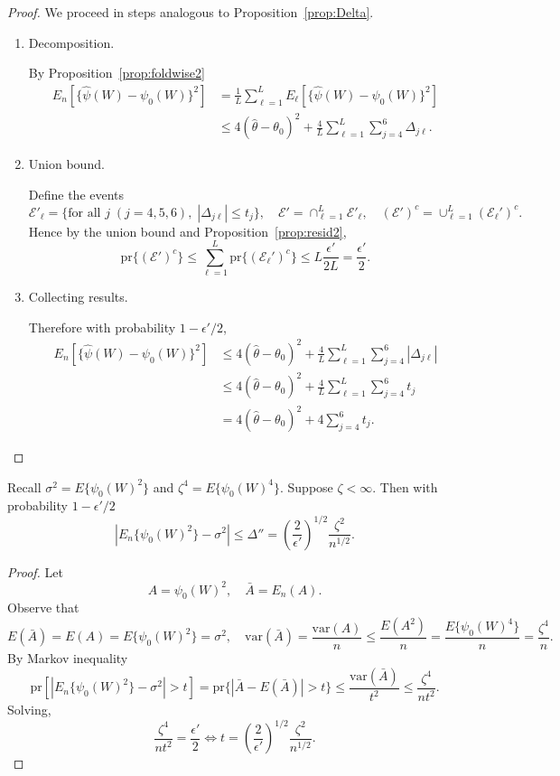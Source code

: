 \begin{proof}
We proceed in steps analogous to Proposition~\ref{prop:Delta}.
\begin{enumerate}
    \item Decomposition.
    
    By Proposition~\ref{prop:foldwise2}
    \begin{align*}
    E_n[\{\hat{\psi}(W)-\psi_0(W)\}^2]
    &=\frac{1}{L} \sum_{\ell=1}^L E_{\ell}[\{\hat{\psi}(W)-\psi_0(W)\}^2] \\
    &\leq 4(\hat{\theta}-\theta_0)^2+\frac{4}{L} \sum_{\ell=1}^L \sum_{j=4}^6 \Delta_{j\ell}.
\end{align*} 

    \item Union bound.
    
    Define the events
$$
\mathcal{E}'_{\ell}=\{\text{for all } j \; (j=4,5,6),\; |\Delta_{j\ell}|\leq t_j\},\quad \mathcal{E}'=\cap_{\ell=1}^L \mathcal{E}'_{\ell},\quad (\mathcal{E}')^c=\cup_{\ell=1}^L (\mathcal{E}_{\ell}')^c.
$$
Hence by the union bound and Proposition~\ref{prop:resid2},
$$
\text{pr}\{(\mathcal{E}')^c\}\leq \sum_{\ell=1}^L \text{pr}\{(\mathcal{E}_{\ell}')^c\} \leq L\frac{\epsilon'}{2L}=\frac{\epsilon'}{2}.
$$
    \item Collecting results.

    Therefore with probability $1-\epsilon'/2$,
\begin{align*}
 E_n[\{\hat{\psi}(W)-\psi_0(W)\}^2]&\leq 4(\hat{\theta}-\theta_0)^2+\frac{4}{L} \sum_{\ell=1}^L \sum_{j=4}^6 |\Delta_{j\ell}| \\
 &\leq 4(\hat{\theta}-\theta_0)^2+\frac{4}{L} \sum_{\ell=1}^L \sum_{j=4}^6 t_j \\
 &=4(\hat{\theta}-\theta_0)^2+4 \sum_{j=4}^6 t_j.
\end{align*}
\end{enumerate}
\end{proof}


\begin{proposition}\label{prop:other_half}
Recall $\sigma^2=E\{\psi_0(W)^2\}$ and $\zeta^4=E\{\psi_0(W)^4\}$. Suppose $\zeta<\infty$. Then with probability $1-\epsilon'/2$
$$
|E_n\{\psi_0(W)^2\}-\sigma^2|\leq \Delta''=\left(\frac{2}{\epsilon'}\right)^{1/2}\frac{\zeta^2}{n^{1/2}}.
$$
\end{proposition}

\begin{proof}
Let
$$
A=\psi_0(W)^2,\quad \bar{A}=E_n(A).
$$
Observe that
$$
E(\bar{A})=E(A)=E\{\psi_0(W)^2\}=\sigma^2,\quad 
\text{var}(\bar{A})=\frac{\text{var}(A)}{n}
\leq \frac{E(A^2)}{n}
=\frac{E\{\psi_0(W)^4\}}{n}=\frac{\zeta^4}{n}.
$$
By Markov inequality
$$
\text{pr}[|E_n\{\psi_0(W)^2\}-\sigma^2|>t]=\text{pr}\{|\bar{A}-E(\bar{A})|>t\}\leq \frac{\text{var}(\bar{A})}{t^2}\leq \frac{\zeta^4}{nt^2}.
$$
Solving,
$$
\frac{\zeta^4}{nt^2}=\frac{\epsilon'}{2} \iff t=\left(\frac{2}{\epsilon'}\right)^{1/2}\frac{\zeta^2}{n^{1/2}}
.$$
\end{proof}

